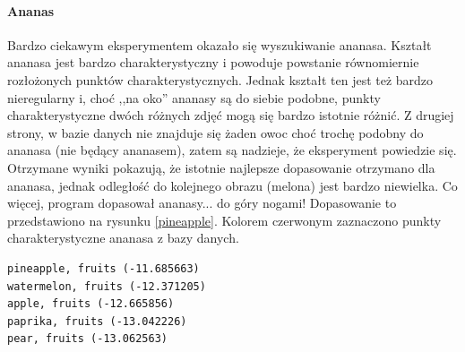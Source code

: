 \documentclass[a4paper,12pt,leqno]{article}
\begin{document}
\paragraph{Ananas}
Bardzo ciekawym eksperymentem okazało się wyszukiwanie ananasa. Kształt ananasa jest bardzo charakterystyczny i powoduje powstanie równomiernie
rozłożonych punktów charakterystycznych. Jednak kształt ten jest też bardzo nieregularny i, choć ,,na oko'' ananasy są do siebie podobne, punkty
charakterystyczne dwóch różnych zdjęć mogą się bardzo istotnie różnić. Z drugiej strony, w bazie danych nie znajduje się żaden owoc choć trochę
podobny do ananasa (nie będący ananasem), zatem są nadzieje, że eksperyment powiedzie się. Otrzymane wyniki pokazują, że istotnie najlepsze
dopasowanie otrzymano dla ananasa, jednak odległość do kolejnego obrazu (melona) jest bardzo niewielka. Co więcej, program dopasował ananasy...
 do góry nogami! Dopasowanie to przedstawiono na rysunku \ref{pineapple}. Kolorem czerwonym zaznaczono punkty charakterystyczne ananasa z bazy danych.
\begin{verbatim}
pineapple, fruits (-11.685663)
watermelon, fruits (-12.371205)
apple, fruits (-12.665856)
paprika, fruits (-13.042226)
pear, fruits (-13.062563)
\end{verbatim}
\end{document}
